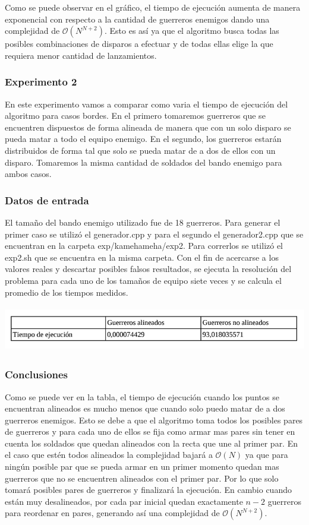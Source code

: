			Como se puede observar en el gráfico, el tiempo de ejecución aumenta de manera exponencial con respecto a la cantidad de guerreros enemigos dando una complejidad de $\mathcal{O}(N^{N+2})$. Esto es así ya que el algoritmo busca todas las posibles combinaciones de disparos a efectuar y de todas ellas elige la que requiera menor cantidad de lanzamientos. \;

		\;
		\;
		
    	\subsubsection*{Experimento 2}\;
    		En este experimento vamos a comparar como varia el tiempo de ejecución del algoritmo para casos bordes. En el primero tomaremos guerreros que se encuentren dispuestos de forma alineada de manera que con un solo disparo se pueda matar a todo el equipo enemigo. En el segundo, los guerreros estarán distribuidos de forma tal que solo se pueda matar de a dos de ellos con un disparo. Tomaremos la misma cantidad de soldados del bando enemigo para ambos casos. \;

    	\subsubsection*{Datos de entrada}\;
    		El tamaño del bando enemigo utilizado fue de 18 guerreros.
			Para generar el primer caso se utilizó el generador.cpp y para el segundo el generador2.cpp que se encuentran en la carpeta exp/kamehameha/exp2. Para correrlos se utilizó el exp2.sh que se encuentra en la misma carpeta.\;
			Con el fin de acercarse a los valores reales y descartar posibles falsos resultados, se ejecuta la resolución del problema para cada uno de los tamaños de equipo siete veces y se calcula el promedio de los tiempos medidos.\;

      	\includegraphics[height=2cm]{graficos/tabla.png}


		\subsubsection*{Conclusiones}\;
			Como se puede ver en la tabla, el tiempo de ejecución cuando los puntos se encuentran alineados es mucho menos que cuando solo puedo matar de a dos guerreros enemigos. Esto se debe a que el algoritmo toma todos los posibles pares de guerreros y para cada uno de ellos se fija como armar mas pares sin tener en cuenta los soldados que quedan alineados con la recta que une al primer par. En el caso que estén todos alineados la complejidad bajará a $\mathcal{O}(N)$ ya que para ningún posible par que se pueda armar en un primer momento quedan mas guerreros que no se encuentren alineados con el primer par. Por lo que solo tomará posibles pares de guerreros y finalizará la ejecución. En cambio cuando están muy desalineados, por cada par inicial quedan exactamente $n - 2$ guerreros para reordenar en pares, generando así una complejidad de $\mathcal{O}(N^{N+2})$.


